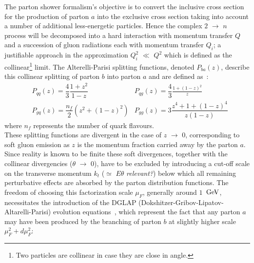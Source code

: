 The parton shower formalism's objective is to convert the inclusive cross section for the production of parton $a$ into the exclusive cross section taking into account a number of additional less-energetic particles.
Hence the complex $2$ $\rightarrow$ $n$ process will be decomposed into a hard interaction with momentum transfer $Q$ and a succession of gluon radiations each with momentum transfer $Q_{i}$; a justifiable approach in the approximation $Q_{i}^{2}$ $\ll$ $Q^2$ which is defined as the collinear\footnote{Two particles are collinear in case they are close in angle.} limit. 
The Alterelli-Parisi splitting functions, denoted $P_{ba}(z)$, describe this collinear splitting of parton $b$ into parton $a$ and are defined as~\cite{}:
\begin{eqnarray}
 & P_{qq}(z) = \dfrac{4}{3} \dfrac{1+z^{2}}{1-z}    & P_{qg}(z) = \dfrac{4}{3} \frac{1+(1-z)^{2}}{z} \\
 & P_{gq}(z) = \dfrac{n_{f}}{2} (z^{2} + (1-z)^{2}) & P_{gg}(z) = 3 \dfrac{z^{4}+1+(1-z)^{4}}{z(1-z)}
\end{eqnarray}
where $n_{f}$ represents the number of quark flavours.
\\
These splitting functions are divergent in the case of $z$ $\rightarrow$ $0$, corresponding to soft gluon emission as $z$ is the momentum fraction carried away by the parton $a$. 
Since reality is known to be finite these soft divergences, together with the collinear divergencies ($\theta$ $\rightarrow$ $0$), have to be excluded by introducing a cut-off scale on the transverse momentum $k_{t}$ ($\simeq$ $E\theta$ \textit{relevant?}) below which all remaining perturbative effects are absorbed by the parton distribution functions. 
The freedom of choosing this factorization scale $\mu_{F}$, generally around $1$ $\, \mathrm{GeV}$, necessitates the introduction of the DGLAP (Dokshitzer-Gribov-Lipatov-Altarelli-Parisi) evolution equations~\cite{}, which represent the fact that any parton $a$ may have been produced by the branching of parton $b$ at slightly higher scale $\mu_{F}^2 + d\mu_{F}^2$:\\
